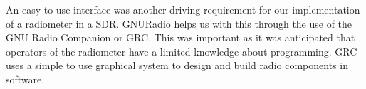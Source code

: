 An easy to use interface was another driving requirement for our implementation of a radiometer in a SDR.  GNURadio helps us with this through the use of the GNU Radio Companion or GRC.  This was important as it was anticipated that operators of the radiometer have a limited knowledge about programming.  GRC uses a simple to use graphical system to design and build radio components in software.





